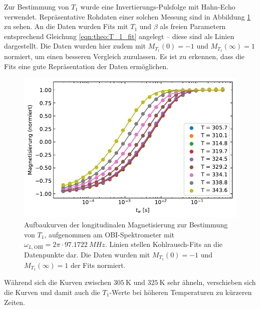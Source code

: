 Zur Bestimmung von $T_1$ wurde eine Invertierungs-Pulsfolge mit Hahn-Echo verwendet. Repräsentative Rohdaten einer solchen Messung sind in Abbildung \ref{fig:res:T_1_roh} zu sehen. An die Daten wurden Fits mit $T_1$ und $\beta$ als freien Parametern entsprechend Gleichung \eqref{eqn:theo:T_1_fit} angelegt -- diese sind als Linien dargestellt. Die Daten wurden hier zudem mit $M_{T_1}(0) = -1$ und $M_{T_1}(\infty) = 1$ normiert, um einen besseren Vergleich zuzulassen. Es ist zu erkennen, dass die Fits eine gute Repräsentation der Daten ermöglichen.
\begin{figure}
	\begin{center}
		\includegraphics[width=.8\textwidth]{graphics/plot/t1_roh3.pdf}
	\end{center}
	\caption{Aufbaukurven der longitudinalen Magnetisierung zur Bestimmung von $T_1$, aufgenommen am OBI-Spektrometer mit $\omega_{L, \text{OBI}} = 2\pi \cdot \SI{97.1722}{MHz}$. Linien stellen Kohlrausch-Fits an die Datenpunkte dar. Die Daten wurden mit $M_{T_1}(0) = -1$ und $M_{T_1}(\infty) = 1$ der Fits normiert.} \label{fig:res:T_1_roh}
\end{figure}

Während sich die Kurven zwischen $\SI{305}{\kelvin}$ und $\SI{325}{\kelvin}$ sehr ähneln, verschieben sich die Kurven und damit auch die $T_1$-Werte bei höheren Temperaturen zu kürzeren Zeiten.


